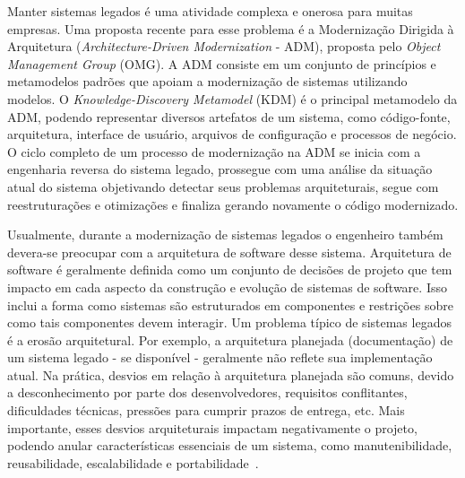 \documentclass[12pt]{article}
\begin{document}
Manter sistemas legados é uma atividade complexa e onerosa para muitas empresas. Uma proposta recente para esse problema é a Modernização Dirigida à Arquitetura (\textit{Architecture-Driven Modernization} - ADM), proposta pelo \textit{Object Management Group} (OMG). A ADM consiste em um conjunto de princípios e metamodelos padrões que apoiam a modernização de sistemas utilizando modelos. O \textit{Knowledge-Discovery Metamodel} (KDM) é o principal metamodelo da ADM, podendo representar diversos artefatos de um sistema, como código-fonte, arquitetura, interface de usuário, arquivos de configuração e processos de negócio. O ciclo completo de um processo de modernização na ADM se inicia com a engenharia reversa do sistema legado, prossegue com uma análise da situação atual do sistema objetivando detectar seus problemas arquiteturais, segue com reestruturações e otimizações e finaliza gerando novamente o código modernizado.


Usualmente, durante a modernização de sistemas legados o engenheiro também devera-se preocupar com a arquitetura de software desse sistema. Arquitetura de software é geralmente definida como um conjunto de decisões de projeto que tem impacto em cada aspecto da construção e evolução de sistemas de software. Isso inclui a forma como sistemas são estruturados em componentes e restrições sobre como tais componentes devem interagir. Um problema típico de sistemas legados é a erosão arquitetural. Por exemplo, a arquitetura planejada (documentação) de um sistema legado - se disponível - geralmente não reflete sua implementação atual. Na prática, desvios em relação à arquitetura planejada são comuns, devido a desconhecimento por parte dos desenvolvedores, requisitos conflitantes, dificuldades técnicas, pressões para cumprir prazos de entrega, etc. Mais importante, esses desvios arquiteturais impactam negativamente o projeto, podendo anular características essenciais de um sistema, como manutenibilidade, reusabilidade, escalabilidade e portabilidade~\cite{Passos_2010}.
\end{document}
